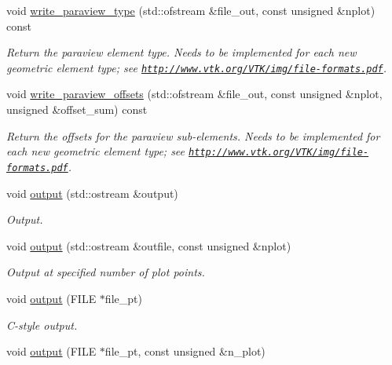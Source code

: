 \begin{DoxyCompactItemize}
void \hyperlink{classoomph_1_1TElement_3_011_00_01NNODE__1D_01_4_a5d269eb451b774f82543eec67c9432c3}{write\+\_\+paraview\+\_\+type} (std\+::ofstream \&file\+\_\+out, const unsigned \&nplot) const
\begin{DoxyCompactList}\small\item\em Return the paraview element type. Needs to be implemented for each new geometric element type; see \href{http://www.vtk.org/VTK/img/file-formats.pdf}{\tt http\+://www.\+vtk.\+org/\+V\+T\+K/img/file-\/formats.\+pdf}. \end{DoxyCompactList}\item 
void \hyperlink{classoomph_1_1TElement_3_011_00_01NNODE__1D_01_4_afde96f5476b4ff45a51ae44f29a89f07}{write\+\_\+paraview\+\_\+offsets} (std\+::ofstream \&file\+\_\+out, const unsigned \&nplot, unsigned \&offset\+\_\+sum) const
\begin{DoxyCompactList}\small\item\em Return the offsets for the paraview sub-\/elements. Needs to be implemented for each new geometric element type; see \href{http://www.vtk.org/VTK/img/file-formats.pdf}{\tt http\+://www.\+vtk.\+org/\+V\+T\+K/img/file-\/formats.\+pdf}. \end{DoxyCompactList}\item 
void \hyperlink{classoomph_1_1TElement_3_011_00_01NNODE__1D_01_4_a0e38a73514f3eb757f5041790f6b7ddc}{output} (std\+::ostream \&output)
\begin{DoxyCompactList}\small\item\em Output. \end{DoxyCompactList}\item 
void \hyperlink{classoomph_1_1TElement_3_011_00_01NNODE__1D_01_4_a3de69d0bb4459e3f22383ccea5d55e0a}{output} (std\+::ostream \&outfile, const unsigned \&nplot)
\begin{DoxyCompactList}\small\item\em Output at specified number of plot points. \end{DoxyCompactList}\item 
void \hyperlink{classoomph_1_1TElement_3_011_00_01NNODE__1D_01_4_a18c5b00c61bc0a612684f763c834618d}{output} (F\+I\+LE $\ast$file\+\_\+pt)
\begin{DoxyCompactList}\small\item\em C-\/style output. \end{DoxyCompactList}\item 
void \hyperlink{classoomph_1_1TElement_3_011_00_01NNODE__1D_01_4_a5f114a354044d07c376087c081fa6b6f}{output} (F\+I\+LE $\ast$file\+\_\+pt, const unsigned \&n\+\_\+plot)

\end{DoxyCompactItemize}
